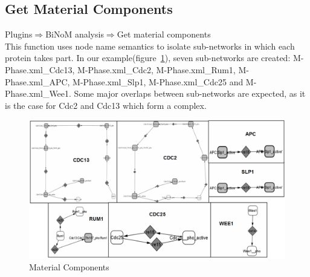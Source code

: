 \subsection{Get Material Components}
Plugins$\Rightarrow$BiNoM analysis$\Rightarrow$Get material components\\
This function uses node name semantics to isolate sub-networks in which each protein takes part. In our example(figure~\ref{Material_Components}), seven sub-networks are created: M-Phase.xml\_Cdc13, M-Phase.xml\_Cdc2, M-Phase.xml\_Rum1, M-Phase.xml\_APC, M-Phase.xml\_Slp1, M-Phase.xml\_Cdc25 and M-Phase.xml\_Wee1. Some major overlaps between sub-networks are expected, as it is the case for Cdc2 and Cdc13 which form a complex.\\
\begin{figure}
\centering
\includegraphics[width=14 cm]{graphics/Material_Components}
\caption{Material Components}
\label{Material_Components}
\end{figure}
